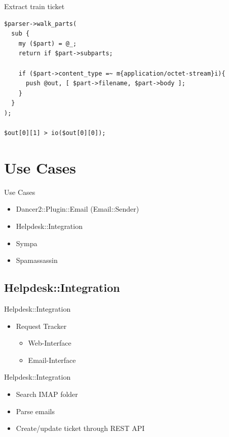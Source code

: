 \begin{frame}[fragile]{Extract train ticket}
\begin{verbatim}
$parser->walk_parts(
  sub {
    my ($part) = @_;
    return if $part->subparts;

    if ($part->content_type =~ m{application/octet-stream}i){
      push @out, [ $part->filename, $part->body ];
    }
  }
);

$out[0][1] > io($out[0][0]);
\end{verbatim}
\end{frame}

\section{Use Cases}

\begin{frame}{Use Cases}
  \begin{itemize}
  \item Dancer2::Plugin::Email (Email::Sender)
  \item Helpdesk::Integration
  \item Sympa
  \item Spamassassin
  \end{itemize}
\end{frame}

\subsection{Helpdesk::Integration}

\begin{frame}{Helpdesk::Integration}
  \begin{itemize}
  \item Request Tracker
    \begin{itemize}
    \item Web-Interface
    \item Email-Interface
    \end{itemize}
  \end{itemize}
\end{frame}

\begin{frame}{Helpdesk::Integration}
  \begin{itemize}
  \item Search IMAP folder
  \item Parse emails
  \item Create/update ticket through REST API
  \end{itemize}
\end{frame}

